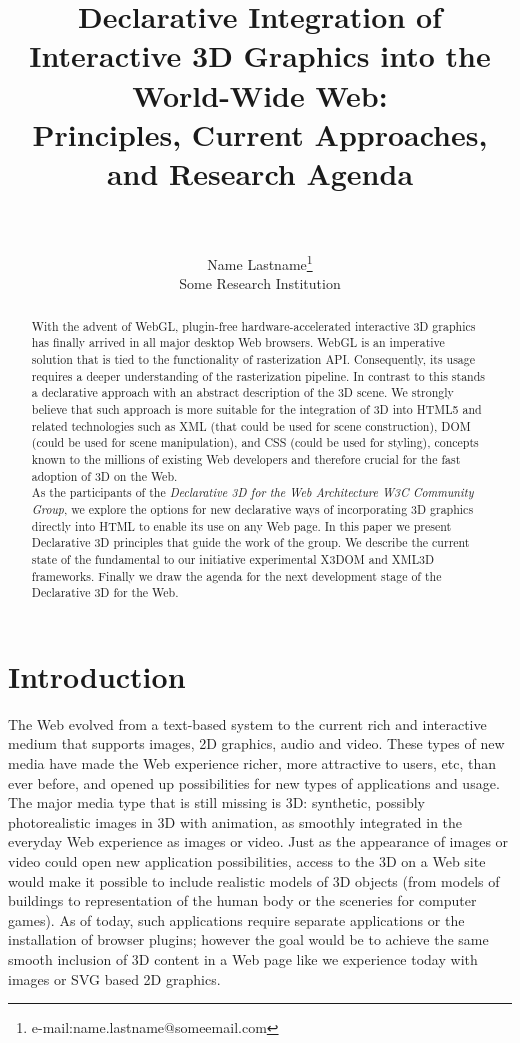 \documentclass[review]{acmsiggraph}
\title{Declarative Integration of Interactive 3D Graphics into the World-Wide Web:\\Principles, Current Approaches, and Research Agenda
\\~} %
\author{Name Lastname\thanks{e-mail:name.lastname@someemail.com}\\Some Research Institution}
\begin{document}
\maketitle

\begin{abstract}
With the advent of WebGL, plugin-free hardware-accelerated interactive 3D graphics has finally arrived in all major desktop Web browsers.
WebGL is an imperative solution that is tied to the functionality of rasterization API. Consequently, its usage requires a deeper understanding of the rasterization pipeline. In contrast to this stands a declarative approach with an abstract description of the 3D scene. We strongly believe that such approach is more suitable for the integration of 3D into HTML5 and related technologies such as XML (that could be used for scene construction), DOM (could be used for scene manipulation), and CSS (could be used for styling), concepts known to the millions of existing Web developers and therefore crucial for the fast adoption of 3D on the Web.\\
As the participants of the \textit{Declarative 3D for the Web Architecture W3C Community Group}, we explore the options for new declarative ways of incorporating 3D graphics directly into HTML to enable its use on any Web page. In this paper we present Declarative 3D principles that guide the work of the group. We describe the current state of the fundamental to our initiative experimental X3DOM and XML3D frameworks. Finally we draw the agenda for the next development stage of the Declarative 3D for the Web.
\end{abstract}

\begin{CRcatlist}
\end{CRcatlist}

\keywordlist
\copyrightspace

\section{Introduction}
The Web evolved from a text-based system to the current rich and interactive medium that supports images, 2D graphics, audio and video. These types of new media have made the Web experience richer, more attractive to users, etc, than ever before, and opened up possibilities for new types of applications and usage. The major media type that is still missing is 3D: synthetic, possibly photorealistic images in 3D with animation, as smoothly integrated in the everyday Web experience as images or video. Just as the appearance of images or video could open new application possibilities, access to the 3D on a Web site would make it possible to include realistic models of 3D objects (from models of buildings to representation of the human body or the sceneries for computer games). As of today, such applications require separate applications or the installation of browser plugins; however the goal would be to achieve the same smooth inclusion of 3D content in a Web page like we experience today with images or SVG based 2D graphics.
\end{document}
